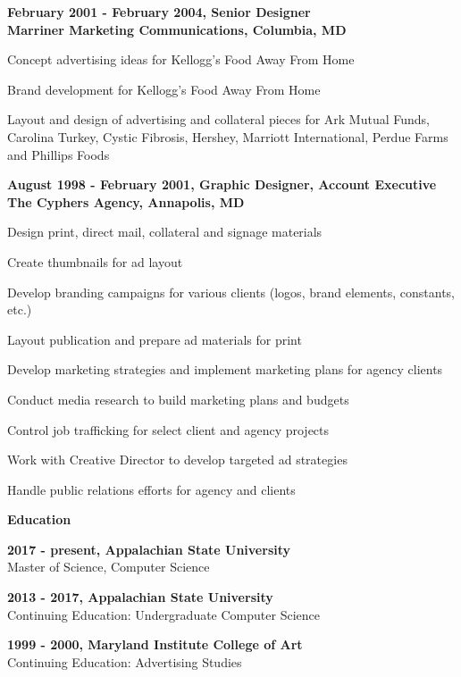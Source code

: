 \documentclass[a4paper,12pt,final]{memoir}
\newcommand{\Sep}{\vspace{1.5em}}
\newcommand{\SmallSep}{\vspace{0.5em}}
\newcommand{\CVSection}[1]
	{\Large\textbf{#1}\par
	\SmallSep\normalsize\normalfont}
\newcommand{\CVItem}[1]
	{\textbf{\color{BrickRed} #1}}
\begin{document}
\CVItem{February 2001 - February 2004, Senior Designer\\
Marriner Marketing Communications, Columbia, MD}
\begin{compactitem}[\color{BrickRed}$\circ$]
	\item Concept advertising ideas for Kellogg's Food Away From Home
	\item Brand development for Kellogg's Food Away From Home
	\item Layout and design of advertising and collateral pieces for Ark Mutual Funds, Carolina Turkey, Cystic Fibrosis, Hershey, Marriott International, Perdue Farms and Phillips Foods
\end{compactitem}
\SmallSep

\CVItem{August 1998 - February 2001, Graphic Designer, Account Executive\\
The Cyphers Agency, Annapolis, MD}
\begin{compactitem}[\color{BrickRed}$\circ$]
	\item Design print, direct mail, collateral and signage materials
	\item Create thumbnails for ad layout
	\item Develop branding campaigns for various clients (logos, brand elements, constants, etc.)
	\item Layout publication and prepare ad materials for print
	\item Develop marketing strategies and implement marketing plans for agency clients
	\item Conduct media research to build marketing plans and budgets
	\item Control job trafficking for select client and agency projects
	\item Work with Creative Director to develop targeted ad strategies
	\item Handle public relations efforts for agency and clients
\end{compactitem}
\SmallSep

\Sep

\CVSection{Education}
\CVItem{2017 - present, Appalachian State University}\\
Master of Science, Computer Science
\SmallSep

\CVItem{2013 - 2017, Appalachian State University}\\
Continuing Education: Undergraduate Computer Science
\SmallSep

\CVItem{1999 - 2000, Maryland Institute College of Art}\\
Continuing Education: Advertising Studies
\SmallSep
\end{document}
